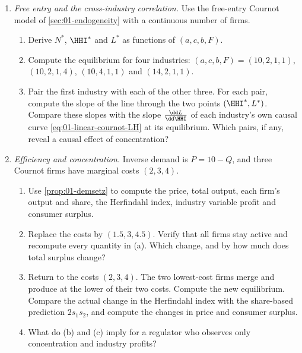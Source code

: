 \begin{enumerate}[label=\arabic*., leftmargin=*, itemsep=6pt]
\item \textit{Free entry and the cross-industry correlation.} Use the free-entry Cournot model of
\cref{sec:01-endogeneity} with a continuous number of firms.
\begin{enumerate}[label=(\alph*)]
  \item Derive $N^*$, $\HHI^*$ and $L^*$ as functions of $(a, c, b, F)$.
  \item Compute the equilibrium for four industries: $(a, c, b, F) = (10, 2, 1, 1)$, $(10, 2, 1, 4)$, $(10, 4, 1, 1)$
  and $(14, 2, 1, 1)$.
  \item Pair the first industry with each of the other three. For each pair, compute the slope of the line through
  the two points $(\HHI^*, L^*)$. Compare these slopes with the slope $\frac{\dd L}{\dd \HHI}$ of each industry's own
  causal curve \eqref{eq:01-linear-cournot-LH} at its equilibrium. Which pairs, if any, reveal a causal effect of
  concentration?
\end{enumerate}

\item \textit{Efficiency and concentration.} Inverse demand is $P = 10 - Q$, and three Cournot firms have
marginal costs $(2, 3, 4)$.
\begin{enumerate}[label=(\alph*)]
  \item Use \cref{prop:01-demsetz} to compute the price, total output, each firm's output and share, the Herfindahl
  index, industry variable profit and consumer surplus.
  \item Replace the costs by $(1.5, 3, 4.5)$. Verify that all firms stay active and recompute every quantity in
  (a). Which change, and by how much does total surplus change?
  \item Return to the costs $(2, 3, 4)$. The two lowest-cost firms merge and produce at the lower of their two
  costs. Compute the new equilibrium. Compare the actual change in the Herfindahl index with the share-based
  prediction $2 s_1 s_2$, and compute the changes in price and consumer surplus.
  \item What do (b) and (c) imply for a regulator who observes only concentration and industry profits?
\end{enumerate}


\end{enumerate}
